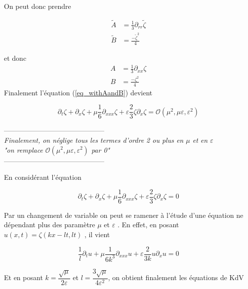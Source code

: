 \documentclass[12pt,a4paper]{article}
\numberwithin{equation}{section}
\begin{document}
On peut donc prendre 

\begin{align*}
    \tilde{A} &= \frac{1}{3}\partial_{rr}\tilde\zeta \\
    \tilde{B} &= \frac{-\tilde\zeta^2}{4}
\end{align*}

et donc 
\begin{align*}
    A &= \frac{1}{3}\partial_{xx}\zeta \\
    B &= \frac{-\zeta^2}{4}
\end{align*}
Finalement l'équation (\ref{eq_withAandB}) devient

\begin{equation*}
    \partial_t\zeta + \partial_x\zeta + \mu  \frac{1}{6}\partial_{xxx}\zeta + \varepsilon  \frac{2}{3}\zeta\partial_x\zeta  = \mathcal{O}(\mu^2, \mu\varepsilon, \varepsilon^2)
\end{equation*}

\begin{center}
    --------------------------------------------\\
   \textit{Finalement, on néglige tous les termes d'ordre 2 ou plus en $\mu$ et en $\varepsilon$}\\
   \textit{"on remplace $\mathcal{O}(\mu^2, \mu\varepsilon,\varepsilon^2)$ par 0"}\\
   --------------------------------------------
\end{center}

En considérant l'équation 

\begin{equation}
    \partial_t\zeta + \partial_x\zeta + \mu  \frac{1}{6}\partial_{xxx}\zeta + \varepsilon  \frac{2}{3}\zeta\partial_x\zeta  = 0 \label{eq_KdV_beforechvar}
\end{equation}

Par un changement de variable on peut se ramener à l'étude d'une équation ne dépendant plus des paramètre $\mu$ et $\varepsilon$ . En effet, en posant $u(x,t) = \zeta(kx-lt,lt)$ , il vient

\begin{equation*}
    \frac{1}{l}\partial_tu + \mu  \frac{1}{6k^3}\partial_{xxx}u + \varepsilon  \frac{2}{3k}u\partial_xu  = 0
\end{equation*}

Et en posant $k = \dfrac{\sqrt{\mu}}{2\varepsilon}$ et $ l =\dfrac{3\sqrt{\mu}}{4\varepsilon^2}$, on obtient finalement les équations de KdV
\end{document}
